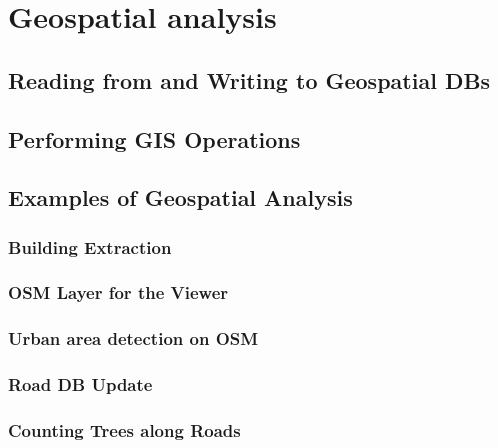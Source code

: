 
\chapter{Geospatial analysis}\label{sec:GeospatialAnalysis}



\section{Reading from and Writing to Geospatial DBs}\label{sec:ReadWriteGISDB}
%

\section{Performing GIS Operations}\label{sec:GISOperations}

\section{Examples of Geospatial Analysis}

\subsection{Building Extraction}
\subsection{OSM Layer for the Viewer}
\subsection{Urban area detection on OSM}
\subsection{Road DB Update}
\subsection{Counting Trees along Roads}



